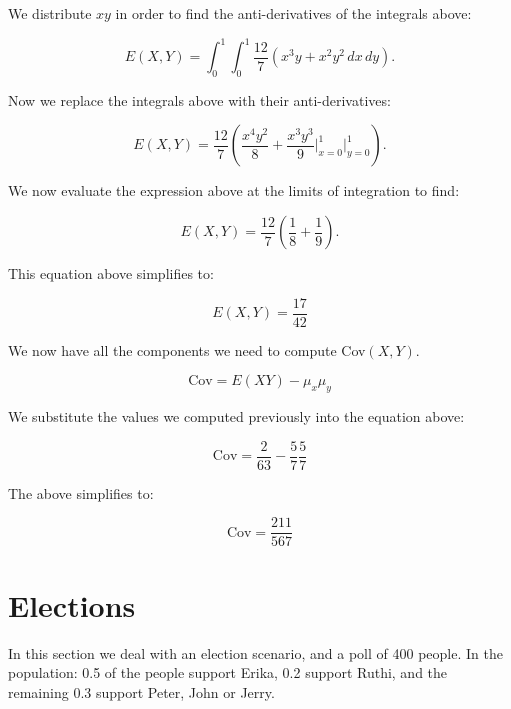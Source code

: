 \documentclass[a5paper,11pt]{article}
\begin{document}
We distribute $xy$ in order to find
the anti-derivatives of the integrals
above:

\begin{equation}
E\left( X,Y \right)=
\int_0^1 \int_0^1
\frac{12}{7} \left(x^3y + x^2y^2 \,dx \,dy
\right).
\end{equation}

Now we replace the integrals above with 
their anti-derivatives:

\begin{equation}
E\left( X,Y \right)=
\frac{12}{7} \left(
\frac{x^4y^2}{8} + \frac{x^3y^3}{9}
\bigg\rvert_{x=0}^1 \bigg\rvert_{y=0}^1
\right).
\end{equation}

We now evaluate the expression above at
the limits of integration to find:

\begin{equation}
E\left( X,Y \right)=
\frac{12}{7} \left(
\frac{1}{8} 
+ \frac{1}{9} 
\right).
\end{equation}

This equation above simplifies to:

\begin{equation}
E\left( X,Y \right)=
\frac{17}{42}
\end{equation}

We now have all the components we need to
compute Cov$\left(X,Y \right)$.

\begin{equation}
\text{Cov} = E \left(XY \right) 
- \mu_x\mu_y
\end{equation}

We substitute the values we computed
previously into the equation above:

\begin{equation}
\text{Cov} =  \frac{2}{63} -
\frac{5}{7} \frac{5}{7}
\end{equation}

The above simplifies to:

\begin{equation}
\text{Cov} =  \frac{211}{567}
\end{equation}

\section{Elections}
In this section we deal with an election
scenario, and a poll of 400 people. In the
population: 0.5 of the people support
Erika, 0.2 support Ruthi, and the
remaining 0.3 support Peter, John or
Jerry.
\end{document}
